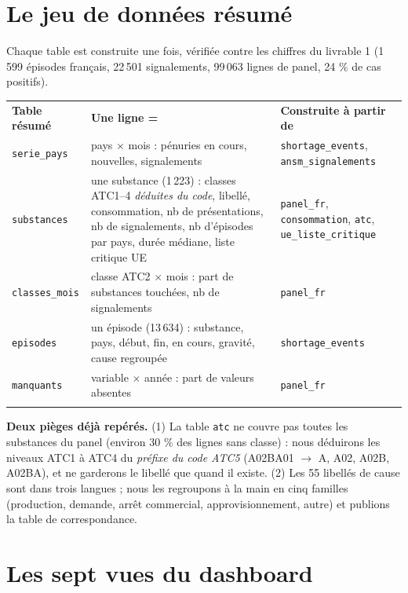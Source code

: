 \documentclass[10.5pt, a4paper]{article}
\newcommand{\entete}[1]{\textbf{\color{gris!20!black}#1}}
\newcommand{\filet}{\arrayrulecolor{gris!40}\hline}
\newcommand{\var}[1]{\texttt{\color{gris!30!black}#1}}
\begin{document}
\section{Le jeu de données résumé}\label{sec:donnees}

Chaque table est construite une fois, vérifiée contre les chiffres du livrable 1 (1\,599 épisodes français,
22\,501 signalements, 99\,063 lignes de panel, 24 \% de cas positifs).

\begin{tabularx}{\linewidth}{>{\raggedright\arraybackslash}p{3.3cm} >{\raggedright\arraybackslash}p{4.4cm} >{\raggedright\arraybackslash}X}
\rowcolor{gris!14}\entete{Table résumé} & \entete{Une ligne =} & \entete{Construite à partir de}\\
\var{serie\_pays} & pays $\times$ mois : pénuries en cours, nouvelles, signalements & \var{shortage\_events}, \var{ansm\_signalements} \\
\var{substances} & une substance (1\,223) : classes ATC1--4 \emph{déduites du code}, libellé, consommation, nb de présentations,
nb de signalements, nb d'épisodes par pays, durée médiane, liste critique UE & \var{panel\_fr}, \var{consommation}, \var{atc}, \var{ue\_liste\_critique} \\
\var{classes\_mois} & classe ATC2 $\times$ mois : part de substances touchées, nb de signalements & \var{panel\_fr} \\
\var{episodes} & un épisode (13\,634) : substance, pays, début, fin, en cours, gravité, cause regroupée & \var{shortage\_events} \\
\var{manquants} & variable $\times$ année : part de valeurs absentes & \var{panel\_fr} \\
\filet
\end{tabularx}

\textbf{Deux pièges déjà repérés.}
(1) La table \var{atc} ne couvre pas toutes les substances du panel (environ 30 \% des lignes sans classe) : nous déduirons les
niveaux ATC1 à ATC4 du \emph{préfixe du code ATC5} (A02BA01 $\to$ A, A02, A02B, A02BA), et ne garderons le libellé que quand il existe.
(2) Les 55 libellés de cause sont dans trois langues ; nous les regroupons à la main en cinq familles (production, demande, arrêt
commercial, approvisionnement, autre) et publions la table de correspondance.

\section{Les sept vues du dashboard}\label{sec:pages}
\end{document}
